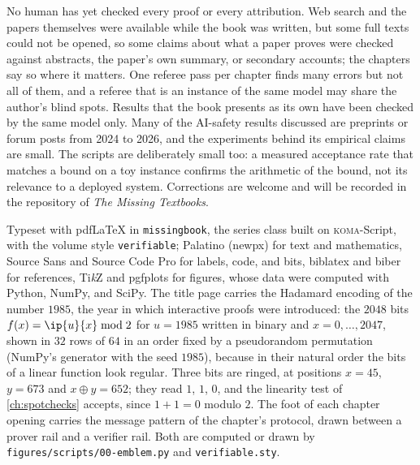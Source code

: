 
No human has yet checked every proof or every attribution. Web search and the papers themselves were available while the book was written, but some full texts could not be opened, so some claims about what a paper proves were checked against abstracts, the paper's own summary, or secondary accounts; the chapters say so where it matters. One referee pass per chapter finds many errors but not all of them, and a referee that is an instance of the same model may share the author's blind spots. Results that the book presents as its own have been checked by the same model only. Many of the AI-safety results discussed are preprints or forum posts from 2024 to 2026, and the experiments behind its empirical claims are small. The scripts are deliberately small too: a measured acceptance rate that matches a bound on a toy instance confirms the arithmetic of the bound, not its relevance to a deployed system. Corrections are welcome and will be recorded in the repository of \emph{The Missing Textbooks}.

\medskip
{\small\noindent Typeset with pdf\LaTeX{} in \texttt{missingbook}, the series class built on \textsc{koma}-Script, with the volume style \texttt{verifiable}; Palatino (newpx) for text and mathematics, Source Sans and Source Code Pro for labels, code, and bits, biblatex and biber for references, Ti\emph{k}Z and pgfplots for figures, whose data were computed with Python, NumPy, and SciPy. The title page carries the Hadamard encoding of the number $1985$, the year in which interactive proofs were introduced: the $2048$ bits $f(x)=\ip{u}{x}\bmod 2$ for $u=1985$ written in binary and $x=0,\dots,2047$, shown in $32$ rows of $64$ in an order fixed by a pseudorandom permutation (NumPy's generator with the seed $1985$), because in their natural order the bits of a linear function look regular. Three bits are ringed, at positions $x=45$, $y=673$ and $x\oplus y=652$; they read $1$, $1$, $0$, and the linearity test of \cref{ch:spotchecks} accepts, since $1+1=0$ modulo $2$. The foot of each chapter opening carries the message pattern of the chapter's protocol, drawn between a prover rail and a verifier rail. Both are computed or drawn by \texttt{figures/scripts/00-emblem.py} and \texttt{verifiable.sty}.\par}
